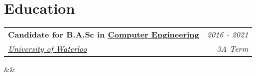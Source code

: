 \documentclass[11.9pt,letterpaper,sans]{moderncv}
\makeatletter
\renewcommand*{\cventry}[7][.25em]{
  \begin{tabular*}{\textwidth}{l@{\extracolsep{\fill}}r}%
      {\bfseries #3\ifthenelse{\equal{#6}{}}{}{, #6}} & {\itshape #2}\\%
      {\itshape #4} & {\itshape #5}\\%
  \end{tabular*}%
  \ifx&#7&%
    \else{\\\vbox{\small#7}}\fi%
  \par\addvspace{#1}}
\makeatother
\begin{document}
	\fi

	\vspace*{-0.5cm}

\setlength{\hintscolumnwidth}{0.1\textwidth}


\section{\textbf{Education}}
\setlength{\hintscolumnwidth}{0.15\textwidth}
\renewcommand*{\cvitem}[3][.2em]{%
  \begin{tabular}{@{}p{\maincolumnwidth}@{\hspace{\separatorcolumnwidth}}p{\hintscolumnwidth}@{}}%
    {#3} &\raggedleft\hintstyle{#2}%
  \end{tabular}%
  \par\addvspace{#1}}

\cventry{\textcolor{color1}{2016 - 2021}}{Candidate for B.A.Sc in \href{https://uwaterloo.ca/electrical-computer-engineering/future-undergraduate-students/computer-engineering}{Computer Engineering}}{\protect\hspace{2px}\href{http://uwaterloo.ca}{University of Waterloo}}{3A Term}{}{}




\end{document}
